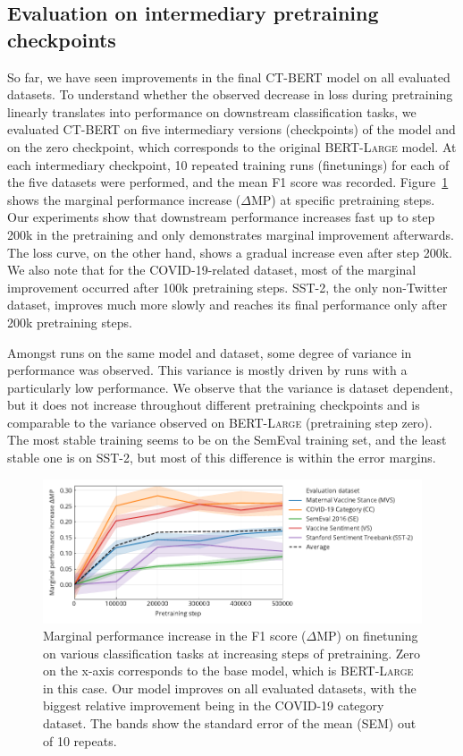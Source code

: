 \documentclass{article}
\begin{document}
\begin{multicols}{2}

\subsection{Evaluation on intermediary pretraining checkpoints}
\label{sec:evaluation_checkpoints}
So far, we have seen improvements in the final \textsc{CT-BERT} model on all evaluated datasets.
  To understand whether the observed decrease in loss during pretraining linearly translates into performance on downstream classification tasks, we evaluated \textsc{CT-BERT} on five intermediary versions (checkpoints) of the model and on the zero checkpoint, which corresponds to the original \textsc{BERT-Large} model.
At each intermediary checkpoint, 10 repeated training runs (finetunings) for each of the five datasets were performed, and the mean F1 score was recorded.
Figure~\ref{fig:fig2} shows the marginal performance increase ($\Delta$MP) at specific pretraining steps.
Our experiments show that downstream performance increases fast up to step \num{200}k in the pretraining and only demonstrates marginal improvement afterwards.
The loss curve, on the other hand, shows a gradual increase even after step \num{200}k.
We also note that for the COVID-19-related dataset, most of the marginal improvement occurred after \num{100}k pretraining steps.
SST-2, the only non-Twitter dataset, improves much more slowly and reaches its final performance only after \num{200}k pretraining steps.

Amongst runs on the same model and dataset, some degree of variance in performance was observed.
This variance is mostly driven by runs with a particularly low performance.
We observe that the variance is dataset dependent, but it does not increase throughout different pretraining checkpoints and is comparable to the variance observed on \textsc{BERT-Large} (pretraining step zero).
The most stable training seems to be on the SemEval training set, and the least stable one is on SST-2, but most of this difference is within the error margins.

\end{multicols}
\begin{figure}[h!]
  \centering
  \includegraphics[]{figures/fig2.pdf}
  \caption{
    Marginal performance increase in the F1 score ($\Delta$MP) on finetuning on various classification tasks at increasing steps of pretraining.
    Zero on the x-axis corresponds to the base model, which is \textsc{BERT-Large} in this case.
    Our model improves on all evaluated datasets, with the biggest relative improvement being in the COVID-19 category dataset.
    The bands show the standard error of the mean (SEM) out of 10 repeats.
  }
  \label{fig:fig2}
\end{figure}
\end{document}
